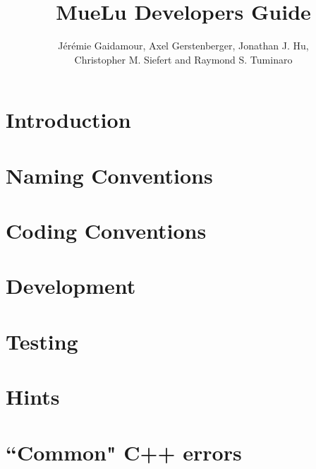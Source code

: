 \documentclass{article}
\title{MueLu Developers Guide}
\author{J\'er\'emie Gaidamour, Axel Gerstenberger, Jonathan J. Hu,\\
        Christopher M. Siefert and  Raymond S. Tuminaro}
\begin{document}

\maketitle

\newpage
\tableofcontents
\newpage

\begin{abstract}

\end{abstract}
\newpage

\pagestyle{myheadings} \thispagestyle{plain} 

\section{Introduction}\label{sec:introduction}


\section{Naming Conventions}\label{sec:naming conventions}


\section{Coding Conventions}\label{sec:coding conventions}


\section{Development}\label{sec:development}


\section{Testing}\label{sec:testing}


\section{Hints}\label{sec:hints}


\section{``Common" C++ errors}\label{sec:common errors}



\newpage
 
\end{document}
